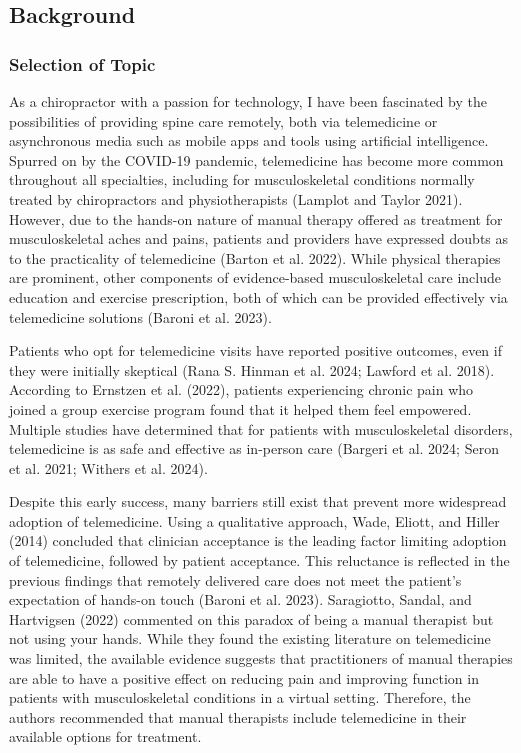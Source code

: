 \documentclass[
  letterpaper,
  DIV=11,
  numbers=noendperiod,
  oneside]{scrartcl}
\begin{document}
\subsection{Background}\label{background}

\subsubsection{Selection of Topic}\label{selection-of-topic}

As a chiropractor with a passion for technology, I have been fascinated
by the possibilities of providing spine care remotely, both via
telemedicine or asynchronous media such as mobile apps and tools using
artificial intelligence. Spurred on by the COVID-19 pandemic,
telemedicine has become more common throughout all specialties,
including for musculoskeletal conditions normally treated by
chiropractors and physiotherapists (Lamplot and Taylor 2021). However,
due to the hands-on nature of manual therapy offered as treatment for
musculoskeletal aches and pains, patients and providers have expressed
doubts as to the practicality of telemedicine (Barton et al. 2022).
While physical therapies are prominent, other components of
evidence-based musculoskeletal care include education and exercise
prescription, both of which can be provided effectively via telemedicine
solutions (Baroni et al. 2023).

Patients who opt for telemedicine visits have reported positive
outcomes, even if they were initially skeptical (Rana S. Hinman et al.
2024; Lawford et al. 2018). According to Ernstzen et al. (2022),
patients experiencing chronic pain who joined a group exercise program
found that it helped them feel empowered. Multiple studies have
determined that for patients with musculoskeletal disorders,
telemedicine is as safe and effective as in-person care (Bargeri et al.
2024; Seron et al. 2021; Withers et al. 2024).

Despite this early success, many barriers still exist that prevent more
widespread adoption of telemedicine. Using a qualitative approach, Wade,
Eliott, and Hiller (2014) concluded that clinician acceptance is the
leading factor limiting adoption of telemedicine, followed by patient
acceptance. This reluctance is reflected in the previous findings that
remotely delivered care does not meet the patient's expectation of
hands-on touch (Baroni et al. 2023). Saragiotto, Sandal, and Hartvigsen
(2022) commented on this paradox of being a manual therapist but not
using your hands. While they found the existing literature on
telemedicine was limited, the available evidence suggests that
practitioners of manual therapies are able to have a positive effect on
reducing pain and improving function in patients with musculoskeletal
conditions in a virtual setting. Therefore, the authors recommended that
manual therapists include telemedicine in their available options for
treatment.
\end{document}
